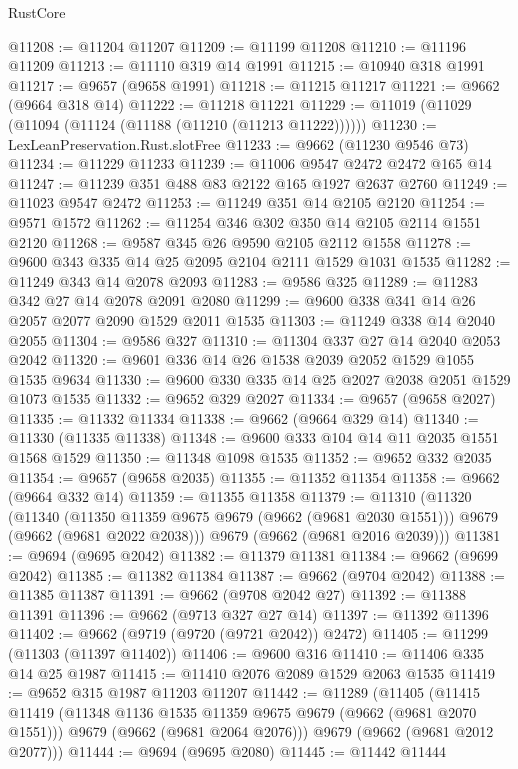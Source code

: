 \begin{lexlean}{RustCore}
\begin{coremodule}
@11208 := @11204 @11207
@11209 := @11199 @11208
@11210 := @11196 @11209
@11213 := @11110 @319 @14 @1991
@11215 := @10940 @318 @1991
@11217 := @9657 (@9658 @1991)
@11218 := @11215 @11217
@11221 := @9662 (@9664 @318 @14)
@11222 := @11218 @11221
@11229 := @11019 (@11029 (@11094 (@11124 (@11188 (@11210 (@11213 @11222))))))
@11230 := LexLeanPreservation.Rust.slotFree
@11233 := @9662 (@11230 @9546 @73)
@11234 := @11229 @11233
@11239 := @11006 @9547 @2472 @2472 @165 @14
@11247 := @11239 @351 @488 @83 @2122 @165 @1927 @2637 @2760
@11249 := @11023 @9547 @2472
@11253 := @11249 @351 @14 @2105 @2120
@11254 := @9571 @1572
@11262 := @11254 @346 @302 @350 @14 @2105 @2114 @1551 @2120
@11268 := @9587 @345 @26 @9590 @2105 @2112 @1558
@11278 := @9600 @343 @335 @14 @25 @2095 @2104 @2111 @1529 @1031 @1535
@11282 := @11249 @343 @14 @2078 @2093
@11283 := @9586 @325
@11289 := @11283 @342 @27 @14 @2078 @2091 @2080
@11299 := @9600 @338 @341 @14 @26 @2057 @2077 @2090 @1529 @2011 @1535
@11303 := @11249 @338 @14 @2040 @2055
@11304 := @9586 @327
@11310 := @11304 @337 @27 @14 @2040 @2053 @2042
@11320 := @9601 @336 @14 @26 @1538 @2039 @2052 @1529 @1055 @1535 @9634
@11330 := @9600 @330 @335 @14 @25 @2027 @2038 @2051 @1529 @1073 @1535
@11332 := @9652 @329 @2027
@11334 := @9657 (@9658 @2027)
@11335 := @11332 @11334
@11338 := @9662 (@9664 @329 @14)
@11340 := @11330 (@11335 @11338)
@11348 := @9600 @333 @104 @14 @11 @2035 @1551 @1568 @1529
@11350 := @11348 @1098 @1535
@11352 := @9652 @332 @2035
@11354 := @9657 (@9658 @2035)
@11355 := @11352 @11354
@11358 := @9662 (@9664 @332 @14)
@11359 := @11355 @11358
@11379 := @11310
    (@11320
      (@11340
        (@11350 @11359 @9675 @9679 (@9662 (@9681 @2030 @1551)))
        @9679
        (@9662 (@9681 @2022 @2038)))
      @9679
      (@9662 (@9681 @2016 @2039)))
@11381 := @9694 (@9695 @2042)
@11382 := @11379 @11381
@11384 := @9662 (@9699 @2042)
@11385 := @11382 @11384
@11387 := @9662 (@9704 @2042)
@11388 := @11385 @11387
@11391 := @9662 (@9708 @2042 @27)
@11392 := @11388 @11391
@11396 := @9662 (@9713 @327 @27 @14)
@11397 := @11392 @11396
@11402 := @9662 (@9719 (@9720 (@9721 @2042)) @2472)
@11405 := @11299 (@11303 (@11397 @11402))
@11406 := @9600 @316
@11410 := @11406 @335 @14 @25 @1987
@11415 := @11410 @2076 @2089 @1529 @2063 @1535
@11419 := @9652 @315 @1987 @11203 @11207
@11442 := @11289
    (@11405
      (@11415
        @11419
        (@11348 @1136 @1535 @11359 @9675 @9679 (@9662 (@9681 @2070 @1551)))
        @9679
        (@9662 (@9681 @2064 @2076)))
      @9679
      (@9662 (@9681 @2012 @2077)))
@11444 := @9694 (@9695 @2080)
@11445 := @11442 @11444

\end{coremodule}
\end{lexlean}
